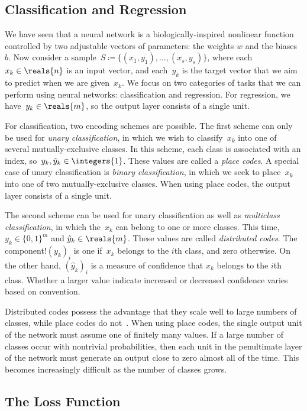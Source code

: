 \documentclass[11pt,a4paper]{article}
\numberwithin{equation}{section}
\begin{document}
\subsection{Classification and Regression}

We have seen that a neural network is a biologically-inspired nonlinear function
controlled by two adjustable vectors of parameters: the weights $w$ and the
biases~$b$. Now consider a sample~$S \coloneqq \{(x_1, y_1), \ldots, (x_s,
y_s)\}$, where each~$x_k \in \reals{n}$ is an input vector, and each~$y_k$ is
the target vector that we aim to predict when we are given~$x_k$. We focus on
two categories of tasks that we can perform using neural networks:
classification and regression. For regression, we have~$y_k \in \reals{m}$, so
the output layer consists of a single unit.

For classification, two encoding schemes are possible. The first scheme can only
be used for \emph{unary classification}, in which we wish to classify~$x_k$ into
one of several mutually-exclusive classes. In this scheme, each class is
associated with an index, so~$y_k, \hat{y}_k \in \integers{1}$. These values are
called a \emph{place codes}. A special case of unary classification is
\emph{binary classification}, in which we seek to place~$x_k$ into one of two
mutually-exclusive classes. When using place codes, the output layer consists of
a single unit.

The second scheme can be used for unary classification as well as
\emph{multiclass classification}, in which the~$x_k$ can belong to one or more
classes. This time,~$y_k \in \{0, 1\}^m$ and $\hat{y}_k \in \reals{m}$. These
values are called \emph{distributed codes}. The component!$(y_k)_i$ is one
if~$x_k$ belongs to the $i$th class, and zero otherwise. On the other hand,
$(\hat{y}_k)_i$ is a measure of confidence that $x_k$ belongs to the $i$th
class. Whether a larger value indicate increased or decreased confidence varies
based on convention.

Distributed codes possess the advantage that they scale well to large
numbers of classes, while place codes do not~\citep{lecun-98b}. When using place
codes, the single output unit of the network must assume one of finitely many
values. If a large number of classes occur with nontrivial probabilities, then
each unit in the penultimate layer of the network must generate an output close
to zero almost all of the time. This becomes increasingly difficult as the
number of classes grows.

\subsection{The Loss Function}
\end{document}
